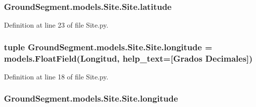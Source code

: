 \hypertarget{class_ground_segment_1_1models_1_1_site_1_1_site_ad80c609e1bc1b700cf5b7928e583233e}{}
\subsubsection[{latitude}]{\setlength{\rightskip}{0pt plus 5cm}Ground\+Segment.\+models.\+Site.\+Site.\+latitude}\label{class_ground_segment_1_1models_1_1_site_1_1_site_ad80c609e1bc1b700cf5b7928e583233e}


Definition at line 23 of file Site.\+py.

\hypertarget{class_ground_segment_1_1models_1_1_site_1_1_site_a91e1633dbbd357a40d63316e779db077}{}
\subsubsection[{longitude}]{\setlength{\rightskip}{0pt plus 5cm}tuple Ground\+Segment.\+models.\+Site.\+Site.\+longitude = models.\+Float\+Field(\textquotesingle{}Longitud\textquotesingle{}, help\+\_\+text=\textquotesingle{}\mbox{[}Grados Decimales\mbox{]}\textquotesingle{})\hspace{0.3cm}{\ttfamily [static]}}\label{class_ground_segment_1_1models_1_1_site_1_1_site_a91e1633dbbd357a40d63316e779db077}


Definition at line 18 of file Site.\+py.

\hypertarget{class_ground_segment_1_1models_1_1_site_1_1_site_ae56f1615fe25e532349f835f2bcc2333}{}
\subsubsection[{longitude}]{\setlength{\rightskip}{0pt plus 5cm}Ground\+Segment.\+models.\+Site.\+Site.\+longitude}\label{class_ground_segment_1_1models_1_1_site_1_1_site_ae56f1615fe25e532349f835f2bcc2333}


